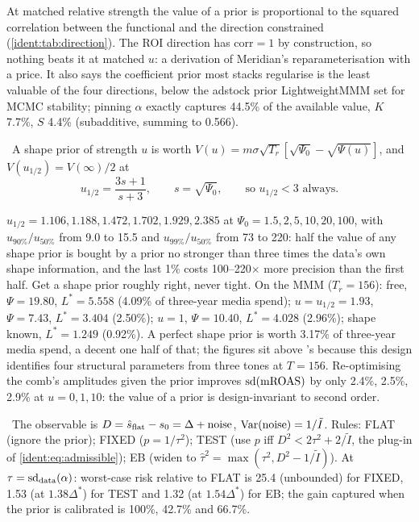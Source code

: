 At matched relative strength the value of a prior is proportional to the squared correlation between the functional and the direction constrained (\cref{ident:tab:direction}). The ROI direction has $\mathrm{corr} = 1$ by construction, so nothing beats it at matched $u$: a derivation of Meridian's reparameterisation with a price. It also says the coefficient prior most stacks regularise is the least valuable of the four directions, below the adstock prior LightweightMMM set for MCMC stability; pinning $\alpha$ exactly captures 44.5\% of the available value, $K$ 7.7\%, $S$ 4.4\% (subadditive, summing to 0.566).

\begin{proposition}
\label{ident:prop:halfvalue}
\tagEstablished\ A shape prior of strength $u$ is worth $V(u) = m\sigma\sqrt{T_r}[\sqrt{\Psi_0} - \sqrt{\Psi(u)}]$, and $V(u_{1/2}) = V(\infty)/2$ at
\begin{equation}
u_{1/2} = \frac{3s + 1}{s + 3}, \qquad s = \sqrt{\Psi_0}, \qquad\text{so } u_{1/2} < 3 \text{ always}.
\label{ident:eq:halfvalue}
\end{equation}
\end{proposition}

$u_{1/2} = 1.106, 1.188, 1.472, 1.702, 1.929, 2.385$ at $\Psi_0 = 1.5, 2, 5, 10, 20, 100$, with $u_{90\%}/u_{50\%}$ from 9.0 to 15.5 and $u_{99\%}/u_{50\%}$ from 73 to 220: half the value of any shape prior is bought by a prior no stronger than three times the data's own shape information, and the last 1\% costs 100--220$\times$ more precision than the first half. Get a shape prior roughly right, never tight. On the MMM ($T_r = 156$): free, $\Psi = 19.80$, $L^* = 5.558$ (4.09\% of three-year media spend); $u = u_{1/2} = 1.93$, $\Psi = 7.43$, $L^* = 3.404$ (2.50\%); $u = 1$, $\Psi = 10.40$, $L^* = 4.028$ (2.96\%); shape known, $L^* = 1.249$ (0.92\%). A perfect shape prior is worth 3.17\% of three-year media spend, a decent one half of that; the figures sit above 's because this design identifies four structural parameters from three tones at $T = 156$. Re-optimising the comb's amplitudes given the prior improves $\mathrm{sd}(\mathrm{mROAS})$ by only 2.4\%, 2.5\%, 2.9\% at $u = 0, 1, 10$: the value of a prior is design-invariant to second order.

\begin{construction}
\label{ident:con:eb}
\tagNumerical\ The observable is $D = \hat s_{\rm flat} - s_0 = \Delta + \text{noise}$, $\operatorname{Var}(\text{noise}) = 1/\tilde I$. Rules: FLAT (ignore the prior); FIXED ($p = 1/\tau^2$); TEST (use $p$ iff $D^2 < 2\tau^2 + 2/\tilde I$, the plug-in of \cref{ident:eq:admissible}); EB (widen to $\hat\tau^2 = \max(\tau^2, D^2 - 1/\tilde I)$). At $\tau = \mathrm{sd}_{\rm data}(\alpha)$: worst-case risk relative to FLAT is 25.4 (unbounded) for FIXED, 1.53 (at $1.38\Delta^*$) for TEST and 1.32 (at $1.54\Delta^*$) for EB; the gain captured when the prior is calibrated is 100\%, 42.7\% and 66.7\%.
\end{construction}

